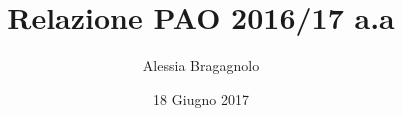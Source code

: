



\title{\textbf{Relazione PAO 2016/17 a.a}}
\author{Alessia Bragagnolo}

\date{18 Giugno 2017}




\makeFrontPage


\tableofcontents



